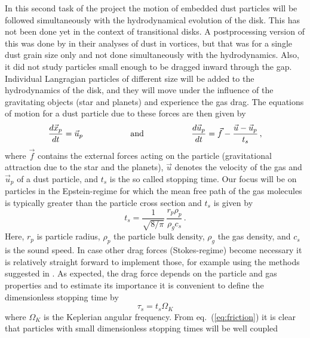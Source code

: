 \documentclass[10pt,fleqn,twoside]{article}
\begin{document}
\begin{description}
In this second task of the project the motion of embedded dust particles will be followed simultaneously
with the hydrodynamical evolution of the disk. This has not been done yet in the context of transitional disks.
A postprocessing version of this was done by \citet{2013A&A...553L...3A} in their analyses of
dust in vortices, but that was for a single
dust grain size only and not done simultaneously with the hydrodynamics. Also, it
did not study particles small enough to be dragged inward through the gap. 
Individual Langragian particles of different size will be added to the
hydrodynamics of the disk, and they will move under the influence of the gravitating objects (star and planets)
and experience the gas drag. The equations of motion for a dust particle due to these forces are
then given by
\begin{equation}
  \label{eq:friction}
        \frac{d \vec{x}_p}{d t}  = \vec{u}_p    \hspace{2.0cm}  \text{and}  \hspace{2.0cm}   
        \frac{d \vec{u}_p}{d t}  = \vec{f}   - \frac{\vec{u} - \vec{u}_p}{t_s} \,,
\end{equation}
where $\vec{f}$ contains the external forces acting on the particle (gravitational attraction due to
the star and the planets), $\vec{u}$ denotes the velocity of the gas and $\vec{u}_p$ of a dust particle,
and $t_s$ is the so called stopping time.
Our focus will be on particles in the Epstein-regime for which the mean free path of the gas molecules 
is typically greater than the particle cross section and $t_s$ is
given by \citep{1924PhRv...23..710E} 
\begin{equation}
  \label{eq:t-stop}
     t_s = \frac{1}{\sqrt{8/\pi}} \, \frac{r_p \rho_p }{\rho_g c_s} \,. 
\end{equation}
Here, $r_p$ is particle radius, $\rho_p$ the particle bulk density, $\rho_g$ the gas density, and $c_s$ is the sound speed.
In case other drag forces (Stokes-regime) become necessary it is relatively straight forward to implement those,
for example using the methods suggested in \citet{2003ApJ...583..996H}.
As expected, the drag force depends on the particle and gas properties and to 
estimate its importance it is convenient to define the dimensionless
stopping time by 
\begin{equation}
    \label{eq:tau-stop}
         \tau_s = t_s \Omega_K
\end{equation}
where $\Omega_K$ is the Keplerian angular frequency.
From eq.~(\ref{eq:friction}) it is clear that particles with small dimensionless stopping times will be well coupled

\end{description}
\end{document}
